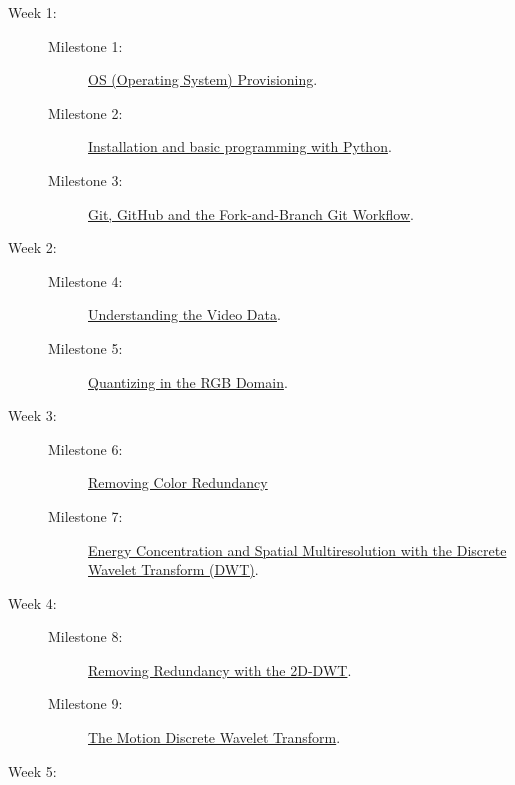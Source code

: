 \begin{description}
\item [Week 1:]
  \begin{description}
  \item [Milestone 1:] \href{https://sistemas-multimedia.github.io/milestones/01-provisioning/}{OS (Operating System) Provisioning}.
  \item [Milestone 2:] \href{https://sistemas-multimedia.github.io/milestones/02-python/}{Installation and basic programming with Python}.
  \item [Milestone 3:] \href{https://sistemas-multimedia.github.io/milestones/03-git/}{Git, GitHub and the Fork-and-Branch Git Workflow}.
  \end{description}
\item [Week 2:]
  \begin{description}
  \item [Milestone 4:] \href{https://sistemas-multimedia.github.io/milestones/04-the_data/}{Understanding the Video Data}.
  \item [Milestone 5:] \href{https://sistemas-multimedia.github.io/milestones/05-quantization/}{Quantizing in the RGB Domain}.
  \end{description}
\item [Week 3:]
  \begin{description}
  \item [Milestone 6:] \href{https://sistemas-multimedia.github.io/milestones/06-color_transform/}{Removing Color Redundancy} %
  \item [Milestone 7:] \href{https://sistemas-multimedia.github.io/milestones/07-DWT/}{Energy Concentration and Spatial Multiresolution with the Discrete Wavelet Transform (DWT)}.
  \end{description}
\item [Week 4:]
  \begin{description}
  \item [Milestone 8:] \href{https://sistemas-multimedia.github.io/milestones/08-2D-DWT/}{Removing Redundancy with the 2D-DWT}.
  \item [Milestone 9:] \href{https://sistemas-multimedia.github.io/milestones/09-MDWT/}{The Motion Discrete Wavelet Transform}.
  \end{description}
\item [Week 5:]

\end{description}
